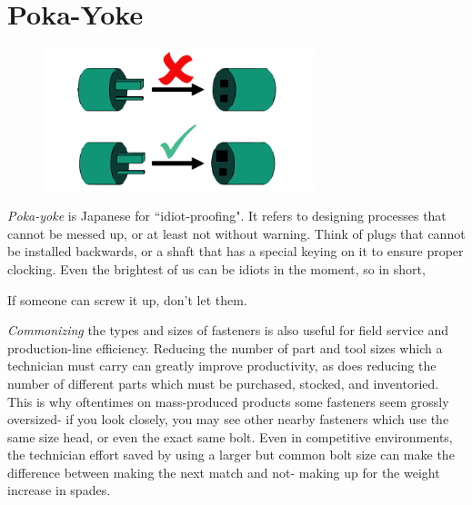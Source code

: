 \section{Poka-Yoke}

\begin{figure}[H]
	\includegraphics[width=0.7\textwidth]{imgs/poka_yoke.png}
\end{figure}

\textit{Poka-yoke} is Japanese for ``idiot-proofing". It refers to designing processes that cannot be messed up, or at least not without warning. Think of plugs that cannot be installed backwards, or a shaft that has a special keying on it to ensure proper clocking. Even the brightest of us can be idiots in the moment, so in short,

\begin{theorem}
If someone can screw it up, don't let them.
\end{theorem}	

\textit{Commonizing} the types and sizes of fasteners is also useful for field service and production-line efficiency. Reducing the number of part and tool sizes which a technician must carry can greatly improve productivity, as does reducing the number of different parts which must be purchased, stocked, and inventoried. This is why oftentimes on mass-produced products some fasteners seem grossly oversized- if you look closely, you may see other nearby fasteners which use the same size head, or even the exact same bolt. Even in competitive environments, the technician effort saved by using a larger but common bolt size can make the difference between making the next match and not- making up for the weight increase in spades.
